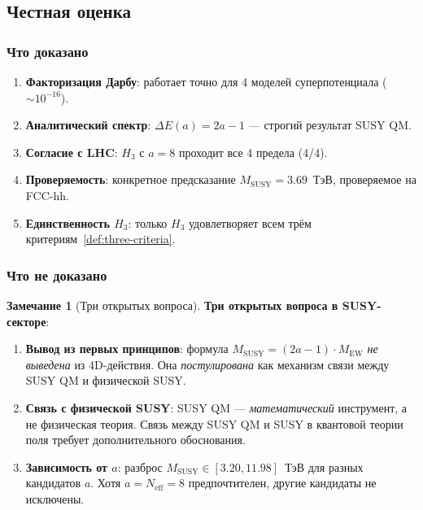 \documentclass[11pt,a4paper]{article}
\theoremstyle{definition}
\newtheorem{remark}[theorem]{Замечание}
\begin{document}
\subsection{Честная оценка}
\label{subsec:susy-honest}

\subsubsection{Что доказано}

\begin{enumerate}
    \item \textbf{Факторизация Дарбу}: работает точно
          для 4 моделей суперпотенциала ($\sim 10^{-16}$).
    \item \textbf{Аналитический спектр}: $\Delta E(a) = 2a - 1$
          --- строгий результат SUSY QM.
    \item \textbf{Согласие с LHC}: $H_3$ с $a = 8$ проходит
          все 4 предела (4/4).
    \item \textbf{Проверяемость}: конкретное предсказание
          $M_{\text{SUSY}} = 3.69$~ТэВ, проверяемое на FCC-hh.
    \item \textbf{Единственность $H_3$}: только $H_3$
          удовлетворяет всем трём критериям~\ref{def:three-criteria}.
\end{enumerate}

\subsubsection{Что не доказано}

\begin{remark}[Три открытых вопроса]
\label{rem:susy-open}
\textbf{Три открытых вопроса в SUSY-секторе}:
\begin{enumerate}
    \item \textbf{Вывод из первых принципов}: формула
          $M_{\text{SUSY}} = (2a-1) \cdot M_{\text{EW}}$
          \emph{не выведена} из 4D-действия. Она
          \emph{постулирована} как механизм связи
          между SUSY QM и физической SUSY.
    \item \textbf{Связь с физической SUSY}: SUSY QM ---
          \emph{математический} инструмент, а не
          физическая теория. Связь между SUSY QM и SUSY
          в квантовой теории поля требует дополнительного
          обоснования.
    \item \textbf{Зависимость от $a$}: разброс
          $M_{\text{SUSY}} \in [3.20, 11.98]$~ТэВ для разных
          кандидатов $a$. Хотя $a = N_{\text{eff}} = 8$
          предпочтителен, другие кандидаты не исключены.
\end{enumerate}
\end{remark}
\end{document}
